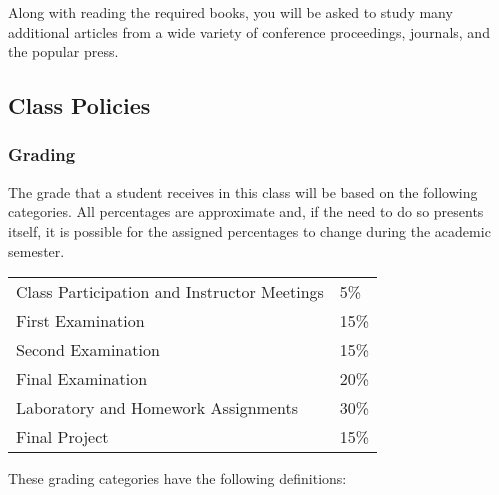 \noindent
Along with reading the required books, you will be asked to study many additional articles from a wide variety of
conference proceedings, journals, and the popular press.

\subsection*{Class Policies}

\subsubsection*{Grading}

The grade that a student receives in this class will be based on the following categories. All percentages are
approximate and, if the need to do so presents itself, it is possible for the assigned percentages to change during the
academic semester. 

\begin{center}
  \begin{tabular}{ll}
    Class Participation and Instructor Meetings & 5\% \\
    First Examination & 15\% \\
    Second Examination & 15\% \\
    Final Examination & 20\% \\
    Laboratory and Homework Assignments & 30\% \\
    Final Project & 15\%
  \end{tabular}
\end{center}

\vspace*{-.1in}
\noindent
These grading categories have the following definitions:
\vspace*{-.1in}


